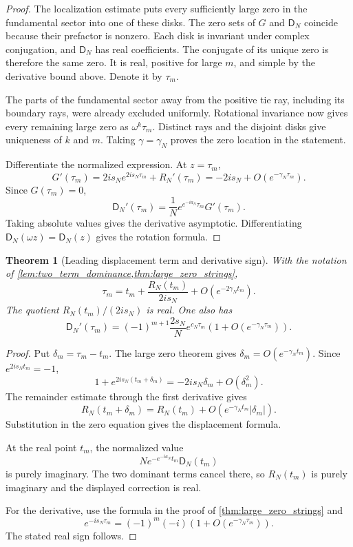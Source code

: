 \documentclass[11pt]{article}
\newtheorem{theorem}{Theorem}[section]
\theoremstyle{definition}
\theoremstyle{remark}
\newcommand{\Dfun}{\mathsf D}
\begin{document}
\begin{proof}
The localization estimate puts every sufficiently large zero in the
fundamental sector into one of these disks.  The zero sets of $G$ and
$\Dfun_N$ coincide because their prefactor is nonzero.  Each disk is
invariant under complex conjugation, and $\Dfun_N$ has real
coefficients.  The conjugate of its unique zero is therefore the same
zero.  It is real, positive for large $m$, and simple by the
derivative bound above.  Denote it by $\tau_m$.

The parts of the fundamental sector away from the positive tie ray,
including its boundary rays, were already excluded uniformly.
Rotational invariance now gives every remaining large zero as
$\omega^k\tau_m$.  Distinct rays and the disjoint disks give uniqueness
of $k$ and $m$.  Taking $\gamma=\gamma_N$ proves the zero location in
the statement.

Differentiate the normalized expression.  At $z=\tau_m$,
\[
G'(\tau_m)
=
2is_Ne^{2is_N\tau_m}+R_N'(\tau_m)
=
-2is_N+O(e^{-\gamma_N\tau_m}).
\]
Since $G(\tau_m)=0$,
\[
\Dfun_N'(\tau_m)
=
\frac1N e^{e^{-ia_N}\tau_m}G'(\tau_m).
\]
Taking absolute values gives the derivative asymptotic.  Differentiating $\Dfun_N(\omega z)=\Dfun_N(z)$ gives the rotation formula.
\end{proof}

\begin{theorem}[Leading displacement term and derivative sign]\label{thm:first_zero_correction}
With the notation of \cref{lem:two_term_dominance,thm:large_zero_strings},
\[
\tau_m
=
t_m+
\frac{R_N(t_m)}{2is_N}
+
O(e^{-2\gamma_Nt_m}).
\]
The quotient $R_N(t_m)/(2is_N)$ is real.  One also has
\[
\Dfun_N'(\tau_m)
=
(-1)^{m+1}
\frac{2s_N}{N}
e^{c_N\tau_m}
\left(1+O(e^{-\gamma_N\tau_m})\right).
\]
\end{theorem}

\begin{proof}
Put $\delta_m=\tau_m-t_m$.  The large zero theorem gives $\delta_m=O(e^{-\gamma_Nt_m})$.  Since $e^{2is_Nt_m}=-1$,
\[
1+e^{2is_N(t_m+\delta_m)}
=
-2is_N\delta_m+O(\delta_m^2).
\]
The remainder estimate through the first derivative gives
\[
R_N(t_m+\delta_m)
=
R_N(t_m)+O(e^{-\gamma_Nt_m}|\delta_m|).
\]
Substitution in the zero equation gives the displacement formula.

At the real point $t_m$, the normalized value
\[
N e^{-e^{-ia_N}t_m}\Dfun_N(t_m)
\]
is purely imaginary.  The two dominant terms cancel there, so $R_N(t_m)$ is purely imaginary and the displayed correction is real.

For the derivative, use the formula in the proof of \cref{thm:large_zero_strings} and
\[
e^{-is_N\tau_m}
=
(-1)^m(-i)
\left(1+O(e^{-\gamma_N\tau_m})\right).
\]
The stated real sign follows.
\end{proof}
\end{document}
